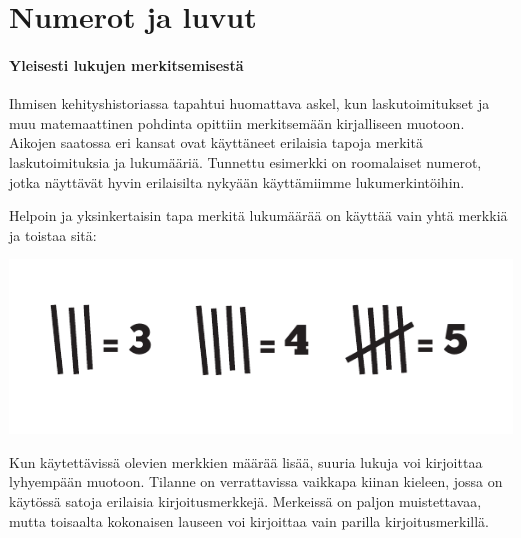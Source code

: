 \section*{Numerot ja luvut}


\paragraph*{Yleisesti lukujen merkitsemisestä}

Ihmisen kehityshistoriassa tapahtui huomattava askel, kun laskutoimitukset ja muu matemaattinen pohdinta opittiin merkitsemään kirjalliseen muotoon. Aikojen saatossa eri kansat ovat käyttäneet erilaisia tapoja merkitä laskutoimituksia ja lukumääriä. Tunnettu esimerkki on roomalaiset numerot, jotka näyttävät hyvin erilaisilta nykyään käyttämiimme lukumerkintöihin.

Helpoin ja yksinkertaisin tapa merkitä lukumäärää on käyttää vain yhtä merkkiä ja toistaa sitä:


\begin{center}
\includegraphics{pictures/Kuva1-1-tukkimiehenkirjanpito.pdf}
\end{center}

Kun käytettävissä olevien merkkien määrää lisää, suuria lukuja voi kirjoittaa lyhyempään muotoon. Tilanne on verrattavissa vaikkapa kiinan kieleen, jossa on käytössä satoja erilaisia kirjoitusmerkkejä. Merkeissä on paljon muistettavaa, mutta toisaalta kokonaisen lauseen voi kirjoittaa vain parilla kirjoitusmerkillä.



